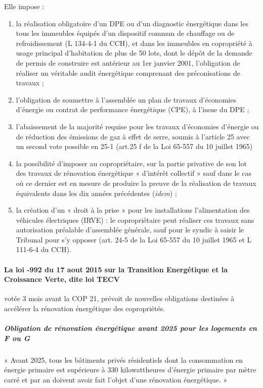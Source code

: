 			Elle impose :
			\begin{enumerate}[label=\alph*)]
				\item la réalisation obligatoire d’un DPE ou d’un diagnostic énergétique dans les tous les immeubles équipés d’un dispositif commun de chauffage ou de refroidissement (L 134-4-1 du CCH), et dans les immeubles en copropriété à usage principal d’habitation de plus de 50 lots, dont le dépôt de la demande de permis de construire est antérieur au 1er janvier 2001, l’obligation de réaliser un véritable audit énergétique comprenant des préconisations de travaux ;
				
				\item l’obligation de soumettre à l’assemblée un plan de travaux d’économies d’énergie ou contrat de performance énergétique (CPE), à l’issue du DPE ;
				
				\item l’abaissement de la majorité requise pour les travaux d'économies d'énergie ou de réduction des émissions de gaz à effet de serre, soumis à l’article 25 avec un second vote possible en 25-1 (art.25 f de la Loi 65-557 du 10 juillet 1965)
				
				\item la possibilité d’imposer au copropriétaire, sur la partie privative de son lot des travaux de rénovation énergétique « d’intérêt collectif » sauf dans le cas où ce dernier est en mesure de produire la preuve de la réalisation de travaux équivalents dans les dix années précédentes (\emph{idem}) ;
				
				\item  la création d’un « droit à la prise » pour les installations l’alimentation des véhicules électriques (IRVE) : le copropriétaire peut réaliser ces travaux sans autorisation préalable d’assemblée générale, sauf pour le syndic à saisir le Tribunal pour s’y opposer (art. 24-5 de la Loi 65-557 du 10 juillet 1965 et L 111-6-4 du CCH).
			\end{enumerate}
			
			\paragraph{La loi -992 du 17 aout 2015 sur la Transition Energétique et la Croissance Verte, dite loi TECV} votée 3 mois avant la COP 21, prévoit de nouvelles obligations destinées à accélérer la rénovation énergétique des copropriétés.
			
			\subparagraph{Obligation de rénovation énergétique avant 2025 pour les logements en F ou G}
			« Avant 2025, tous les bâtiments privés résidentiels dont la consommation en énergie primaire est supérieure à 330 kilowattheures d’énergie primaire par mètre carré et par an doivent avoir fait l’objet d’une rénovation énergétique. »
			
